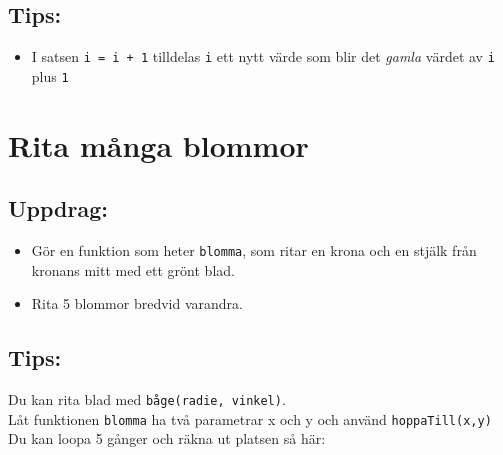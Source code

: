 \section*{\color{OliveGreen}Tips:}


\begin{itemize}

\item {I satsen \lstinline{i = i + 1} tilldelas \lstinline{i} ett nytt värde som blir det {\it gamla} värdet av \lstinline{i} plus \lstinline{1}}

\end{itemize}


\chapter{Rita många blommor}\section*{\color{BrickRed}Uppdrag:}


\begin{itemize}

\item {Gör en funktion som heter \lstinline{blomma}, som ritar en krona och en stjälk från kronans mitt med ett grönt blad.}
\item {Rita 5 blommor bredvid varandra.}

\end{itemize}



  
\section*{\color{OliveGreen}Tips:}
Du kan rita blad med \lstinline{båge(radie, vinkel)}. \\
Låt funktionen \lstinline{blomma} ha två parametrar x och y och använd \lstinline{hoppaTill(x,y)}\\
Du kan loopa 5 gånger och räkna ut platsen så här:

